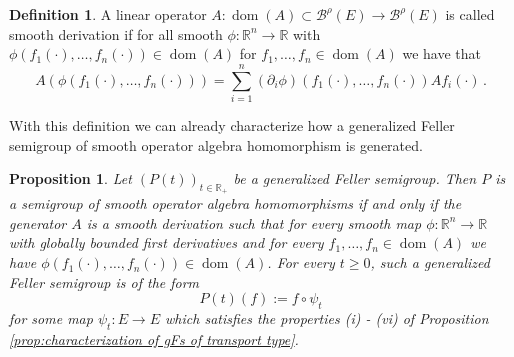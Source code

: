 \documentclass[a4paper,12pt]{article}
\newtheorem{proposition}[theorem]{Proposition}
\theoremstyle{definition}
\newtheorem{definition}[theorem]{Definition}
\theoremstyle{remark}
\numberwithin{equation}{section}
\numberwithin{theorem}{section}
\begin{document}
\begin{definition}
A linear operator $A : \operatorname{dom}(A) \subset \mathcal{\mathscr{B}}^{\rho}(E) \to \mathcal{\mathscr{B}}^{\rho}(E)$ is called smooth derivation if for all smooth $ \phi: \mathbb{R}^n \to \mathbb{R}$ with $\phi(f_1(\cdot),\ldots,f_n(\cdot)) \in \operatorname{dom}(A) $ for $f_1,\ldots,f_n \in \operatorname{dom}(A)$ we have that
$$
A(\phi(f_1(\cdot),\ldots,f_n(\cdot))) = \sum_{i=1}^n (\partial_i \phi)(f_1(\cdot),\ldots,f_n(\cdot))  A f_i(\cdot) \, .
$$
\end{definition}

With this definition we can already characterize how a generalized Feller semigroup of smooth operator algebra homomorphism is generated.

\begin{proposition}\label{prop:alghomoderiv}
Let $\left(P(t)\right)_{t\in\mathbb{R}_{+}}$ be a generalized Feller semigroup. Then $P$ is a semigroup of smooth operator algebra  homomorphisms if and only if the generator $A$ is a smooth derivation such that for every smooth map $\phi : \mathbb{R}^n \to \mathbb{R}$ with globally bounded first derivatives and for every $f_1,\ldots,f_n \in \operatorname{dom}(A)$ we have $\phi(f_1(\cdot),\ldots,f_n(\cdot)) \in \operatorname{dom}(A)$.
For every $t \geq 0$, such a generalized Feller semigroup  is of the form
$$
P(t)(f):=f\circ\psi_{t}
$$
for some map $\psi_t:E \to E$ which satisfies the properties (i) - (vi) of Proposition \ref{prop:characterization of gFs of transport type}.
\end{proposition}
\end{document}
